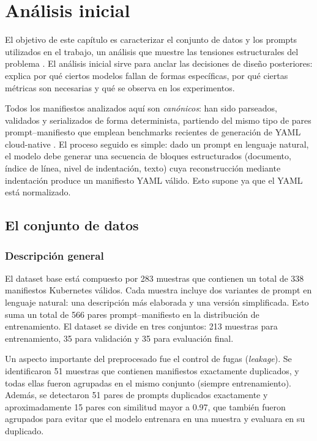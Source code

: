 %
\chapter{Análisis inicial}
\label{ch::chapter3}

El objetivo de este capítulo es caracterizar el conjunto de datos y los prompts utilizados en el trabajo,
un análisis que muestre las tensiones estructurales del problema \citep{yang2025structeval, li2023strucbench}. El análisis inicial sirve para anclar las decisiones de 
diseño posteriores: explica por qué
ciertos modelos fallan de formas específicas, por qué ciertas métricas son necesarias y qué se observa en los experimentos.

Todos los manifiestos analizados aquí son \textit{canónicos}: han sido parseados, validados y serializados de forma determinista, partiendo del mismo tipo de pares
prompt--manifiesto que emplean benchmarks recientes de generación de YAML cloud-native \citep{xu2024cloudevalyaml, cloudeval2023}. El proceso seguido es simple: dado un
prompt en lenguaje natural, el modelo debe generar una secuencia de bloques estructurados (documento, índice de línea, nivel de indentación, texto) cuya
reconstrucción mediante indentación produce un manifiesto YAML válido. Esto supone ya que el YAML está normalizado.

\section{El conjunto de datos}

\subsection{Descripción general}

El dataset base está compuesto por 283 muestras que contienen un total de 338 manifiestos Kubernetes válidos. Cada muestra incluye dos variantes de prompt en lenguaje
natural: una descripción más elaborada y una versión simplificada. Esto suma un total de 566 pares prompt--manifiesto en la distribución de entrenamiento. El dataset se
divide en tres conjuntos: 213 muestras para entrenamiento, 35 para validación y 35 para evaluación final.

Un aspecto importante del preprocesado fue el control de fugas (\textit{leakage}). Se identificaron 51 muestras que contienen manifiestos exactamente duplicados, y
todas ellas fueron agrupadas en el mismo conjunto (siempre entrenamiento). Además, se detectaron 51 pares de prompts duplicados exactamente y aproximadamente 15 pares
con similitud mayor a 0.97, que también fueron agrupados para evitar que el modelo entrenara en una muestra y evaluara en su duplicado.

